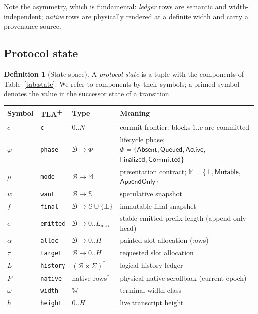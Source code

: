 \documentclass[11pt]{article}
\newcommand{\Blocks}{\mathcal{B}}
\newcommand{\Snap}{\mathbb{S}}
\newcommand{\Wd}{\mathbb{W}}
\newcommand{\NoFinal}{\bot}
\newcommand{\Undecl}{\bot}
\newcommand{\Mutable}{\mathsf{Mutable}}
\newcommand{\AppendOnly}{\mathsf{AppendOnly}}
\newcommand{\Absent}{\mathsf{Absent}}
\newcommand{\Queued}{\mathsf{Queued}}
\newcommand{\Active}{\mathsf{Active}}
\newcommand{\Finalized}{\mathsf{Finalized}}
\newcommand{\Committed}{\mathsf{Committed}}
\newcommand{\Ledger}{L}
\newcommand{\Native}{P}
\newcommand{\Lmax}{L_{\max}}
\newcommand{\tla}[1]{\texttt{#1}}
\theoremstyle{definition}
\newtheorem{definition}[theorem]{Definition}
\theoremstyle{remark}
\begin{document}
Note the asymmetry, which is fundamental: \emph{ledger} rows are semantic and
width-independent; \emph{native} rows are physically rendered at a definite
width and carry a provenance source.

\subsection{Protocol state}\label{sec:state}

\begin{definition}[State space]\label{def:state}
A \emph{protocol state} is a tuple with the components of
Table~\ref{tab:state}. We refer to components by their symbols; a primed
symbol denotes the value in the successor state of a transition.
\end{definition}

\begin{table}[htbp]
\centering\footnotesize
\begin{tabular}{@{}lllp{5.9cm}@{}}
\toprule
Symbol & TLA\textsuperscript{+} & Type & Meaning \\
\midrule
$c$ & \tla{c} & $0..N$ & commit frontier: blocks $1..c$ are committed \\
$\varphi$ & \tla{phase} & $\Blocks\to\Phi$ & lifecycle phase;
  $\Phi=\{\Absent,\Queued,\Active,$ $\Finalized,\Committed\}$ \\
$\mu$ & \tla{mode} & $\Blocks\to\mathbb{M}$ &
  presentation contract; $\mathbb{M}=\{\Undecl,\Mutable,$
  $\AppendOnly\}$ \\
$w$ & \tla{want} & $\Blocks\to\Snap$ & speculative snapshot \\
$f$ & \tla{final} & $\Blocks\to\Snap\cup\{\NoFinal\}$ & immutable final
  snapshot \\
$e$ & \tla{emitted} & $\Blocks\to 0..\Lmax$ & stable emitted prefix length
  (append-only head) \\
$\alpha$ & \tla{alloc} & $\Blocks\to 0..H$ & painted slot allocation
  (rows) \\
$\tau$ & \tla{target} & $\Blocks\to 0..H$ & requested slot allocation \\
$\Ledger$ & \tla{history} & $(\Blocks\times\Sigma)^{*}$ & logical history
  ledger \\
$\Native$ & \tla{native} & native rows$^{*}$ & physical native scrollback
  (current epoch) \\
$\omega$ & \tla{width} & $\Wd$ & terminal width class \\
$h$ & \tla{height} & $0..H$ & live transcript height \\

\end{tabular}
\end{table}
\end{document}
